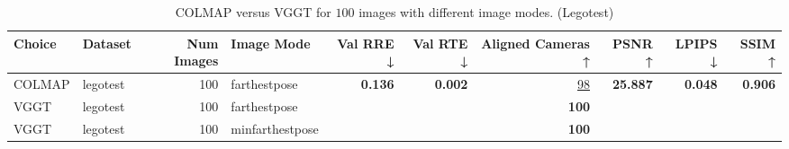 \begin{table}[H]
\caption{\ifdefined\customcaption \customcaption \else COLMAP versus VGGT for $100$ images with different image modes. (Legotest) \fi}
\label{tab:01_image_mode_dense_legotest}
\centering
\scriptsize
\begin{tabular}{llrlrrrrrr}
\toprule
Choice & Dataset & Num Images & Image Mode & Val RRE ↓ & Val RTE ↓ & Aligned Cameras ↑ & PSNR ↑ & LPIPS ↓ & SSIM ↑ \\
\midrule
COLMAP & legotest & 100 & farthestpose & \textbf{0.136} & \textbf{0.002} & \underline{98} & \textbf{25.887} & \textbf{0.048} & \textbf{0.906} \\
VGGT & legotest & 100 & farthestpose &  &  & \textbf{100} &  &  &  \\
VGGT & legotest & 100 & minfarthestpose &  &  & \textbf{100} &  &  &  \\
\bottomrule
\end{tabular}
\end{table}